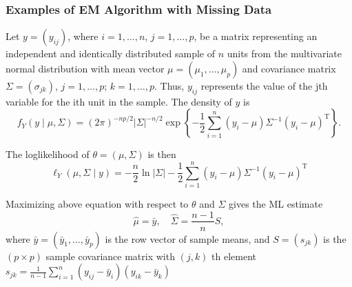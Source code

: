 \subsubsection{Examples of EM Algorithm with Missing Data}

\begin{example}
	Let $y=\left(y_{i j}\right)$, where $i=1, \ldots, n$, $j=1, \ldots, p$, be a matrix representing an independent and identically distributed sample of $n$ units from the multivariate normal distribution with mean vector $\mu=\left(\mu_{1}, \ldots, \mu_{p}\right)$ and covariance matrix $\Sigma=(\sigma_{j k})$, $j=1, \ldots, p$; $k=1,\ldots, p$. Thus, $y_{i j}$ represents the value of the jth variable for the ith unit in the sample. The density of $y$ is
	\begin{equation}
		f_{Y}(y\mid\mu,\Sigma)=(2 \pi)^{-n p / 2}|\Sigma|^{-n / 2} \exp \left\{-\frac{1}{2} \sum_{i=1}^{n}\left(y_{i}-\mu\right) \Sigma^{-1}\left(y_{i}-\mu\right)^{\mathrm{T}}\right\}.
	\end{equation}

	The loglikelihood of $\theta=(\mu, \Sigma)$ is then
	\begin{equation}
		\ell_{Y}(\mu, \Sigma \mid y)=-\frac{n}{2}\ln |\Sigma|-\frac{1}{2} \sum_{i=1}^{n}\left(y_{i}-\mu\right) \Sigma^{-1}\left(y_{i}-\mu\right)^{\mathrm{T}}
	\end{equation}

	Maximizing above equation with respect to $\theta$ and $\Sigma$ gives the ML estimate
	\begin{equation}
		\hat{\mu}=\bar{y},\quad \hat{\Sigma}=\frac{n-1}{n}S,
	\end{equation}
	where $\bar{y}=\left(\bar{y}_{1}, \ldots, \bar{y}_{p}\right)$ is the row vector of sample means, and $S=\left(s_{j k}\right)$ is the $(p\times p)$ sample covariance matrix with $(j, k)$ th element $s_{j k}=\frac{1}{n-1}\sum_{i=1}^{n}\left(y_{i j}-\bar{y}_{i}\right)\left(y_{i k}-\bar{y}_{k}\right)$
\end{example}


